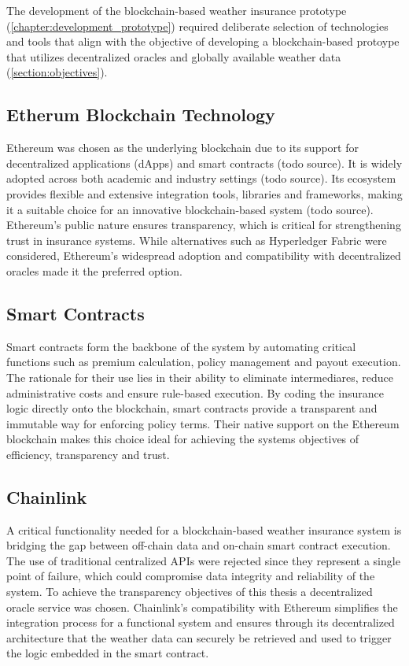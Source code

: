 The development of the blockchain-based weather insurance prototype (\cref{chapter:development_prototype}) required deliberate selection of technologies and tools that align with the objective of developing a blockchain-based protoype that utilizes decentralized oracles and globally available weather data (\cref{section:objectives}). 

\subsection{Etherum Blockchain Technology}
Ethereum was chosen as the underlying blockchain due to its support for decentralized applications (dApps) and smart contracts (todo source). It is widely adopted across both academic and industry settings (todo source). Its ecosystem provides flexible and extensive integration tools, libraries and frameworks, making it a suitable choice for an innovative blockchain-based system (todo source). Ethereum's public nature ensures transparency, which is critical for strengthening trust in insurance systems. While alternatives such as Hyperledger Fabric were considered, Ethereum's widespread adoption and compatibility with decentralized oracles made it the preferred option.

\subsection{Smart Contracts}
Smart contracts form the backbone of the system by automating critical functions such as premium calculation, policy management and payout execution. The rationale for their use lies in their ability to eliminate intermediares, reduce administrative costs and ensure rule-based execution. By coding the insurance logic directly onto the blockchain, smart contracts provide a transparent and immutable way for enforcing policy terms. Their native support on the Ethereum blockchain makes this choice ideal for achieving the systems objectives of efficiency, transparency and trust.

\subsection{Chainlink}
A critical functionality needed for a blockchain-based weather insurance system is bridging the gap between off-chain data and on-chain smart contract execution. The use of traditional centralized APIs were rejected since they represent a single point of failure, which could compromise data integrity and reliability of the system. To achieve the transparency objectives of this thesis a decentralized oracle service was chosen. Chainlink's compatibility with Ethereum simplifies the integration process for a functional system and ensures through its decentralized architecture that the weather data can securely be retrieved and used to trigger the logic embedded in the smart contract.

